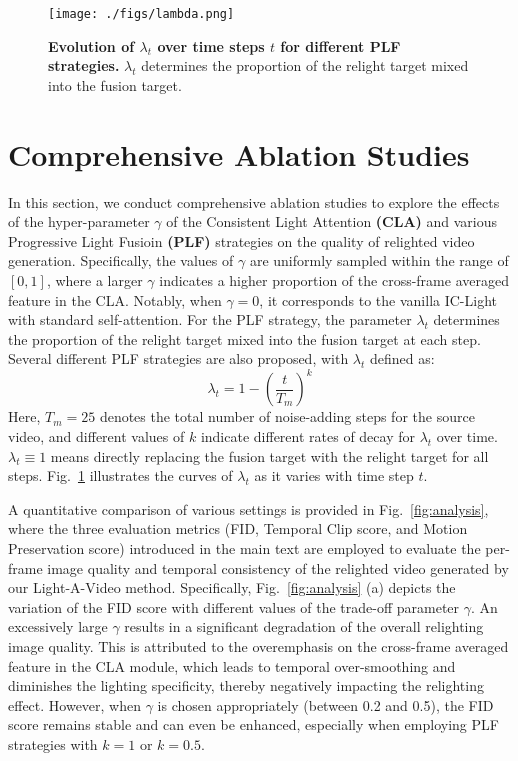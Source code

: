 \clearpage
\setcounter{page}{1}
\maketitlesupplementary
\appendix
\begin{figure}[htbp]
    \centering
    \texttt{[image: ./figs/lambda.png]}
    \caption{\textbf{Evolution of $\lambda_t$ over time steps $t$ for different PLF strategies.}
     $\lambda_t$ determines the proportion of the relight target mixed into the fusion target.
    }
    \label{fig:lambda}
    \vspace{-1em}
\end{figure}
\section{Comprehensive Ablation Studies}
In this section, we conduct comprehensive ablation studies to explore the effects of 
the hyper-parameter $\gamma$ of the Consistent Light Attention \textbf{(CLA)} 
and various Progressive Light Fusioin \textbf{(PLF)} strategies on the quality of relighted video generation.
Specifically, the values of $\gamma$ are uniformly sampled within the range of $[0,1]$, where
a larger $\gamma$ indicates a higher proportion of the cross-frame averaged feature in the CLA.
Notably, when $\gamma=0$, it corresponds to the vanilla IC-Light with standard self-attention.
For the PLF strategy, the parameter $\lambda_t$ determines
the proportion of the relight target mixed into the fusion target at each step.
Several different PLF strategies are also proposed, with $\lambda_t$ defined as:
\begin{equation}
\lambda_t = 1 - \left(\frac{t}{T_m}\right)^k
\end{equation}
Here, $T_m=25$ denotes the total number of noise-adding steps for the source video,
and different values of $k$ indicate different rates of decay for $\lambda_t$ over time.
$\lambda_t \equiv 1$ means directly replacing the fusion target with the relight target for all steps.
Fig.~\ref{fig:lambda} illustrates the curves of $\lambda_t$ as it varies with time step $t$.

A quantitative comparison of various settings is provided in Fig.~\ref{fig:analysis}, where the
three evaluation metrics (FID, Temporal Clip score, and Motion Preservation score) introduced in the main text are employed to
evaluate the per-frame image quality and temporal consistency of the relighted video generated by our Light-A-Video method.
Specifically, Fig.~\ref{fig:analysis} (a) depicts the variation of the FID score with different values of the trade-off parameter $\gamma$.
An excessively large $\gamma$ results in a significant degradation of the overall relighting image quality.
This is attributed to the overemphasis on the cross-frame averaged feature in the CLA module, 
which leads to temporal over-smoothing and diminishes the lighting specificity, 
thereby negatively impacting the relighting effect.
However, when $\gamma$ is chosen appropriately (between 0.2 and 0.5), the FID score remains stable and 
can even be enhanced, especially when employing PLF strategies with $k=1$ or $k=0.5$.

